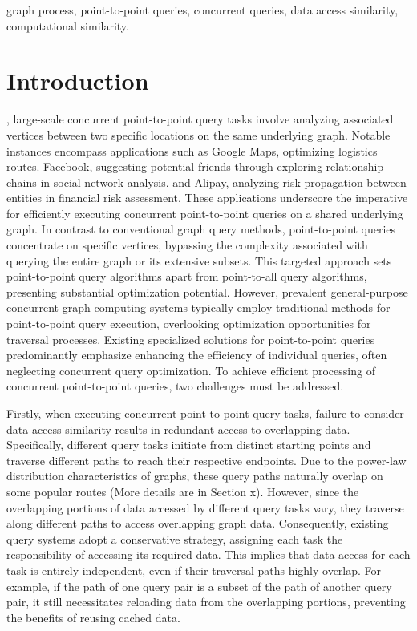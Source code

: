 \documentclass[lettersize,journal]{IEEEtran} %
\begin{document}
\begin{IEEEkeywords}
graph process, point-to-point queries, concurrent queries, data access similarity, computational similarity.
\end{IEEEkeywords}


\section{Introduction}

, large-scale concurrent point-to-point query tasks involve analyzing associated vertices between two specific locations on the same underlying graph. Notable instances encompass applications such as Google Maps\cite{google}, optimizing logistics routes. Facebook\cite{facebook}, suggesting potential friends through exploring relationship chains in social network analysis. and Alipay\cite{alipay}, analyzing risk propagation between entities in financial risk assessment. These applications underscore the imperative for efficiently executing concurrent point-to-point queries on a shared underlying graph. In contrast to conventional graph query methods, point-to-point queries concentrate on specific vertices, bypassing the complexity associated with querying the entire graph or its extensive subsets. This targeted approach sets point-to-point query algorithms apart from point-to-all query algorithms, presenting substantial optimization potential. However, prevalent general-purpose concurrent graph computing systems\cite{glign} typically employ traditional methods for point-to-point query execution, overlooking optimization opportunities for traversal processes. Existing specialized solutions for point-to-point queries\cite{sgraph}\cite{tripoline}\cite{pnp} predominantly emphasize enhancing the efficiency of individual queries, often neglecting concurrent query optimization. To achieve efficient processing of concurrent point-to-point queries, two challenges must be addressed.


Firstly, when executing concurrent point-to-point query tasks, failure to consider data access similarity results in redundant access to overlapping data. Specifically, different query tasks initiate from distinct starting points and traverse different paths to reach their respective endpoints. Due to the power-law distribution characteristics of graphs, these query paths naturally overlap on some popular routes (More details are in Section x). However, since the overlapping portions of data accessed by different query tasks vary, they traverse along different paths to access overlapping graph data. Consequently, existing query systems adopt a conservative strategy, assigning each task the responsibility of accessing its required data. This implies that data access for each task is entirely independent, even if their traversal paths highly overlap. For example, if the path of one query pair is a subset of the path of another query pair, it still necessitates reloading data from the overlapping portions, preventing the benefits of reusing cached data.
\end{document}
